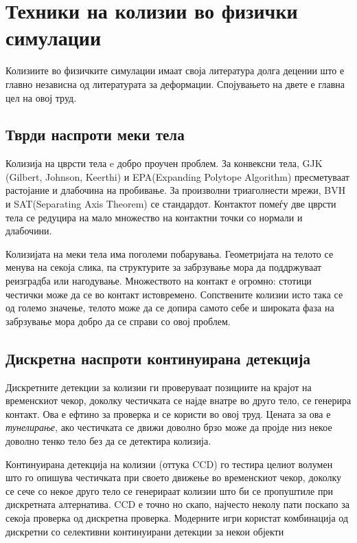 \section{Техники на колизии во физички симулации}

Колизиите во физичките симулации имаат своја литература долга децении што е главно независна од литературата за деформации. Спојувањето на двете е главна цел на овој труд.

\subsection{Тврди наспроти меки тела}

Колизија на цврсти тела e добро проучен проблем. За конвексни тела, GJK (Gilbert, Johnson, Keerthi) и EPA(Expanding Polytope Algorithm) пресметуваат растојание и длабочина на пробивање. За произволни триаголнести мрежи, BVH и SAT(Separating Axis Theorem) се стандардот. Контактот помеѓу две цврсти тела се редуцира на мало множество на контактни точки со нормали и длабочини.

Колизијата на меки тела има поголеми побарувања. Геометријата на телото се менува на секоја слика, па структурите за забрзување мора да поддржуваат реизградба или нагодување. Множеството на контакт е огромно: стотици честички може да се во контакт истовремено. Сопствените колизии исто така се од големо значење, телото може да се допира самото себе и  широката фаза на забрзување мора добро да се справи со овој проблем.

\subsection{Дискретна наспроти континуирана детекција}
Дискретните детекции за колизии ги проверуваат позициите на крајот на временскиот чекор, доколку честичката се најде внатре во друго тело, се генерира контакт. Ова е ефтино за проверка и се користи во овој труд. Цената за ова е \textit{тунелирање}, ако честичката се движи доволно брзо може да пројде низ некое доволно тенко тело без да се детектира колизија.

Континуирана детекција на колизии (оттука CCD) го тестира целиот волумен што го опишува честичката при своето движење во временскиот чекор, доколку се сече со некое друго тело се генерираат колизии што би се пропуштиле при дискретната алтернатива. CCD е точно но скапо, најчесто неколу пати поскапо за секоја проверка од дискретна проверка. Модерните игри користат комбинација од дискретни со селективни континуирани детекции за некои објекти

